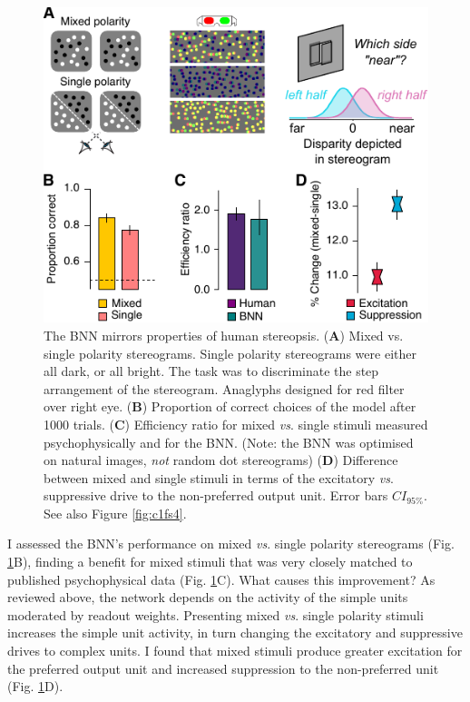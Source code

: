 {\begin{figure}[!h]
  \centering
  \includegraphics{chapter1/chapter1-figs/Fig5.pdf}
  \caption[The BNN mirrors properties of human stereopsis.]{ The BNN mirrors properties of human stereopsis. ({\bf A}) Mixed vs. single polarity stereograms. Single polarity stereograms were either all dark, or all bright. The task was to discriminate the step arrangement of the stereogram. Anaglyphs designed for red filter over right eye. ({\bf B}) Proportion of correct choices of the model after 1000 trials. ({\bf C}) Efficiency ratio for mixed {\it vs}. single stimuli measured psychophysically \cite{Harris:1995va} and for the BNN. (Note: the BNN was optimised on natural images, {\it not} random dot stereograms) ({\bf D}) Difference between mixed and single stimuli in terms of the excitatory {\it vs}. suppressive drive to the non-preferred output unit. Error bars $CI_{95\%}$. See also Figure \ref{fig:c1fs4}.}
  \label{fig:c1f5}
\end{figure}

I assessed the BNN's performance on mixed {\it vs}. single polarity stereograms (Fig. \ref{fig:c1f5}B), finding a benefit for mixed stimuli that was very closely matched to published psychophysical data \cite{Harris:1995va, Read:2011im} (Fig. \ref{fig:c1f5}C). What causes this improvement? As reviewed above, the network depends on the activity of the simple units moderated by readout weights. Presenting mixed {\it vs}. single polarity stimuli increases the simple unit activity, in turn changing the excitatory and suppressive drives to complex units. I found that mixed stimuli produce greater excitation for the preferred output unit and increased suppression to the non-preferred unit (Fig. \ref{fig:c1f5}D). 

}
